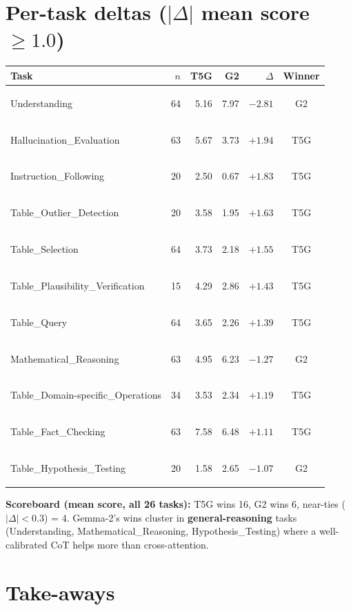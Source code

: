 \documentclass[11pt]{article}
\newcommand{\hl}[1]{\colorbox{hilite}{\strut #1}}
\begin{document}
\section*{Per-task deltas ($|\Delta|$ mean score $\geq 1.0$)}

\begin{tabular}{@{}lrrrrc@{}}
\toprule
Task & $n$ & T5G & G2 & $\Delta$ & Winner \\
\midrule
Understanding & 64 & 5.16 & \hl{7.97} & $-2.81$ & G2 \\
Hallucination\_Evaluation & 63 & \hl{5.67} & 3.73 & $+1.94$ & T5G \\
Instruction\_Following & 20 & \hl{2.50} & 0.67 & $+1.83$ & T5G \\
Table\_Outlier\_Detection & 20 & \hl{3.58} & 1.95 & $+1.63$ & T5G \\
Table\_Selection & 64 & \hl{3.73} & 2.18 & $+1.55$ & T5G \\
Table\_Plausibility\_Verification & 15 & \hl{4.29} & 2.86 & $+1.43$ & T5G \\
Table\_Query & 64 & \hl{3.65} & 2.26 & $+1.39$ & T5G \\
Mathematical\_Reasoning & 63 & 4.95 & \hl{6.23} & $-1.27$ & G2 \\
Table\_Domain-specific\_Operations & 34 & \hl{3.53} & 2.34 & $+1.19$ & T5G \\
Table\_Fact\_Checking & 63 & \hl{7.58} & 6.48 & $+1.11$ & T5G \\
Table\_Hypothesis\_Testing & 20 & 1.58 & \hl{2.65} & $-1.07$ & G2 \\
\bottomrule
\end{tabular}

\medskip

\textbf{Scoreboard (mean score, all 26 tasks):} T5G wins 16, G2 wins 6,
near-ties ($|\Delta| < 0.3$) = 4. Gemma-2's wins cluster in
\textbf{general-reasoning} tasks (Understanding, Mathematical\_Reasoning,
Hypothesis\_Testing) where a well-calibrated CoT helps more than
cross-attention.

\section*{Take-aways}
\end{document}
